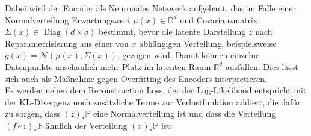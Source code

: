 \documentclass[12pt]{article}
\newcommand{\R}{\mathbb{R}}
\newcommand{\bP}{\mathbb{P}}
\begin{document}
	Dabei wird der Encoder als Neuronales Netzwerk aufgebaut, das im Falle einer Normalverteilung Erwartungswert $\mu(x) \in \R^d$ und Covarianzmatrix $\Sigma(x) \in \operatorname{Diag}(d\times d)$ bestimmt, bevor die latente Darstellung $z$ nach Reparametrisierung aus einer von $x$ abhängigen Verteilung, beispielsweise $g(x) = \mathcal{N}\left(\mu(x),\Sigma(x)\right)$, gezogen wird. Damit können einzelne Datenpunkte anschaulich mehr Platz im latenten Raum $\R^d$ ausfüllen. Dies lässt sich auch als Maßnahme gegen Overfitting des Encoders interpretieren.\\ Es werden neben dem Reconstruction Loss, der der Log-Likelihood entspricht mit der KL-Divergenz noch zusätzliche Terme zur Verlustfunktion addiert, die dafür zu sorgen, dass $(z)_*\bP$ eine Normalverteilung ist und dass die Verteilung $(f \circ z)_*\bP$ ähnlich der Verteilung $(x)_*\bP$ ist.
\end{document}
